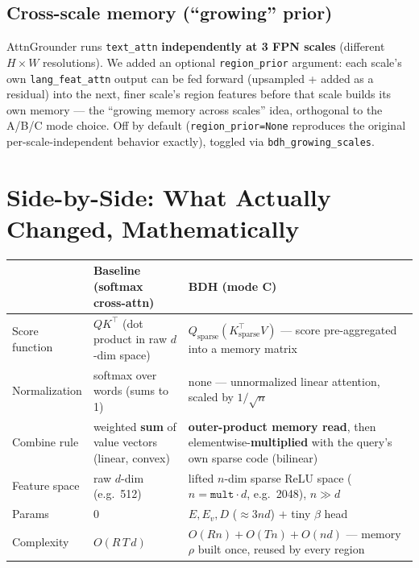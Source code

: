 \documentclass[11pt]{article}
\begin{document}
\subsection{Cross-scale memory (``growing'' prior)}

AttnGrounder runs \texttt{text\_attn} \textbf{independently at 3 FPN scales}
(different $H\times W$ resolutions). We added an optional \texttt{region\_prior}
argument: each scale's own \texttt{lang\_feat\_attn} output can be fed forward
(upsampled + added as a residual) into the next, finer scale's region features
before that scale builds its own memory --- the ``growing memory across scales''
idea, orthogonal to the A/B/C mode choice. Off by default
(\texttt{region\_prior=None} reproduces the original per-scale-independent
behavior exactly), toggled via \texttt{bdh\_growing\_scales}.

\section{Side-by-Side: What Actually Changed, Mathematically}

\begin{center}
\renewcommand{\arraystretch}{1.35}
\begin{tabular}{p{2.6cm}p{5.5cm}p{6.3cm}}
\toprule
 & \textbf{Baseline (softmax cross-attn)} & \textbf{BDH (mode C)} \\
\midrule
Score function & $QK^{\top}$ (dot product in raw $d$-dim space) & $Q_{\text{sparse}}(K_{\text{sparse}}^{\top}V)$ --- score pre-aggregated into a memory matrix \\
Normalization & softmax over words (sums to 1) & none --- unnormalized linear attention, scaled by $1/\sqrt n$ \\
Combine rule & weighted \textbf{sum} of value vectors (linear, convex) & \textbf{outer-product memory read}, then elementwise-\textbf{multiplied} with the query's own sparse code (bilinear) \\
Feature space & raw $d$-dim (e.g.\ 512) & lifted $n$-dim sparse ReLU space ($n = \texttt{mult}\cdot d$, e.g.\ 2048), $n \gg d$ \\
Params & 0 & $E, E_v, D$ ($\approx 3nd$) $+$ tiny $\beta$ head \\
Complexity & $O(R\,T\,d)$ & $O(Rn) + O(Tn) + O(nd)$ --- memory $\rho$ built once, reused by every region \\
\bottomrule
\end{tabular}
\end{center}
\end{document}
